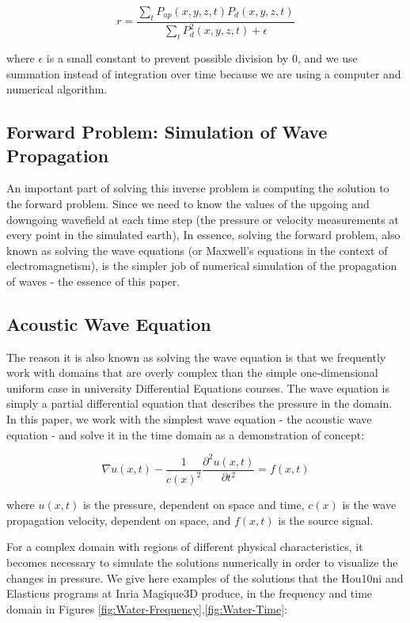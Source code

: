 $$r = \frac{\sum\limits_t P_{up}(x,y,z,t) P_d(x,y,z,t)}{\sum\limits_t P_d^2(x,y,z,t) + \epsilon}$$ 

where $\epsilon$ is a small constant to prevent possible division by $0$, and we use summation instead of integration over time because we are using a computer and numerical algorithm.



\subsection{Forward Problem: Simulation of Wave Propagation}

An important part of solving this inverse problem is computing the solution to the forward problem. Since we need to know the values of the upgoing and downgoing wavefield at each time step (the pressure or velocity measurements at every point in the simulated earth), In essence, solving the forward problem, also known as solving the wave equations (or Maxwell's equations in the context of electromagnetism), is the simpler job of numerical simulation of the propagation of waves - the essence of this paper. 


\subsection{Acoustic Wave Equation}

The reason it is also known as solving the wave equation is that we frequently work with domains that are overly complex than the simple one-dimensional uniform case in university Differential Equations courses. The wave equation is simply a partial differential equation that describes the pressure in the domain. In this paper, we work with the simplest wave equation - the acoustic wave equation - and solve it in the time domain as a demonstration of concept:

$$\nabla u(x,t) - \frac{1}{c(x)^2} \frac{\partial^2 u(x,t)}{\partial t^2} = f(x,t)$$

where $u(x,t)$ is the pressure, dependent on space and time, $c(x)$ is the wave propagation velocity, dependent on space, and $f(x,t)$ is the source signal.


For a complex domain with regions of different physical characteristics, it becomes necessary to simulate the solutions numerically in order to visualize the changes in pressure. We give here examples of the solutions that the Hou10ni and Elasticus programs at Inria Magique3D produce, in the frequency and time domain in Figures \ref{fig:Water-Frequency},\ref{fig:Water-Time}: 

